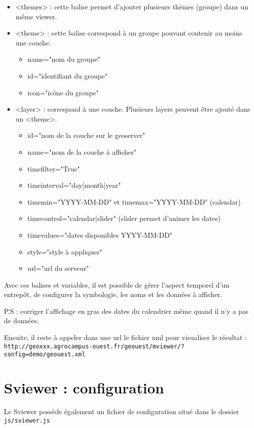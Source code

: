 \documentclass[10pt,a4paper]{article}
\begin{document}
\begin{itemize}
\item <themes> : cette balise permet d'ajouter plusieurs thèmes (groupe) dans un même viewer.
\item <theme> : cette balise correspond à un groupe pouvant contenir au moins une couche.
\begin{itemize}
\item name="nom du groupe"
\item id="identifiant du groupe"
\item icon="icône du groupe"
\end{itemize}
\item <layer> : correspond à une couche. Plusieurs layers peuvent être ajouté dans un <theme>.
\begin{itemize}
\item id="nom de la couche sur le geoserver"
\item name="nom de la couche à afficher"
\item timefilter="True"
\item timeinterval="day|month|year"
\item timemin="YYYY-MM-DD" et timemax="YYYY-MM-DD" (calendar)
\item timecontrol="calendar|slider" (slider permet d'animer les dates)
\item timevalues="dates disponibles YYYY-MM-DD"
\item style="style à appliquer"
\item url="url du serveur"
\end{itemize}
\end{itemize}

Avec ces balises et variables, il est possible de gérer l'aspect temporel d'un entrepôt, de configurer la symbologie, les noms et les données à afficher.

P.S : corriger l'affichage en gras des dates du calendrier même quand il n'y a pas de données.

Ensuite, il reste à appeler dans une url le fichier xml pour visualiser le résultat : \verb!http://geoxxx.agrocampus-ouest.fr/geouest/mviewer/?config=demo/geouest.xml!

\section{Sviewer : configuration}
Le Sviewer possède également un fichier de configuration situé dans le dossier \verb!js/sviewer.js!
\end{document}

